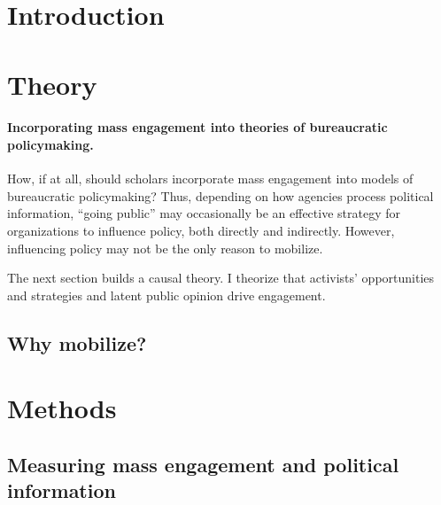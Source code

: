 \documentclass{article}
\begin{document}
\newpage
\section{Introduction} \label{intro}


\section{Theory} 
\paragraph{Incorporating mass engagement into theories of bureaucratic policymaking.}
How, if at all, should scholars incorporate mass engagement into models of bureaucratic policymaking? 
Thus, depending on how agencies process political information, ``going public'' may occasionally be an effective strategy for organizations to influence policy, both directly and indirectly. However, influencing policy may not be the only reason to mobilize. 

The next section builds a causal theory. I theorize that activists' opportunities and strategies and latent public opinion drive engagement.



\subsection{Why mobilize?} \label{whymail-intro}




\section{Methods}

\subsection{Measuring mass engagement and political information}
\label{whyMail-methods}

\end{document}
